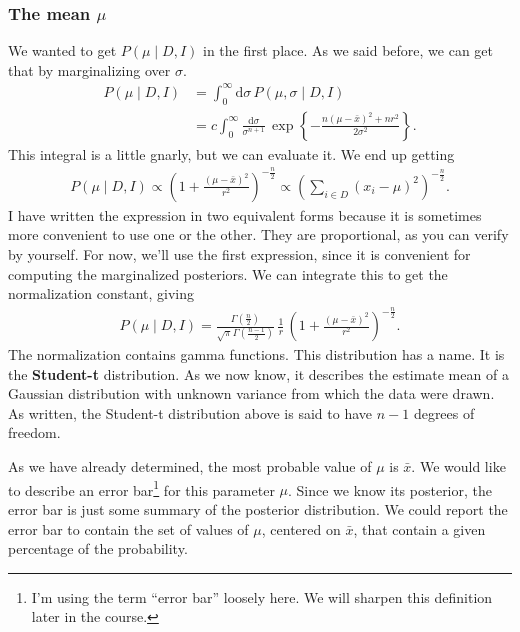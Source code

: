 \subsubsection{The mean $\mu$}
We wanted to get $P(\mu\mid D, I)$ in the first place.  As we said
before, we can get that by marginalizing over $\sigma$.
\begin{align}
P(\mu\mid D, I) &= \int_0^\infty \mathrm{d}\sigma\,P(\mu, \sigma \mid D, I) \\ \nonumber
&= c\int_0^\infty \frac{\mathrm{d}\sigma}{\sigma^{n+1}}\,
\exp\left\{-\frac{n(\mu - \bar{x})^2 + nr^2}{2\sigma^2}\right\}.
\end{align}
This integral is a little gnarly, but we can evaluate it.  We end up
getting
\begin{align}
P(\mu\mid D, I) \propto \left(1 + \frac{(\mu - \bar{x})^2}{r^2}\right)^{-\frac{n}{2}} \propto \left(\sum_{i\in D} (x_i - \mu)^2\right)^{-\frac{n}{2}}.
\end{align}
I have written the expression in two equivalent forms because it is sometimes more convenient to use one or the other. They are proportional, as you can verify by yourself. For now, we'll use the first expression, since it is convenient for computing the marginalized posteriors.
We can integrate this to get the normalization constant, giving
\begin{align}
P(\mu\mid D, I) = \frac{\Gamma\left(\frac{n}{2}\right)}{\sqrt{\pi}\Gamma\left(\frac{n-1}{2}\right)}\,\frac{1}{r}\,\left(1 + \frac{(\mu - \bar{x})^2}{r^2}\right)^{-\frac{n}{2}}.
\end{align}
The normalization contains gamma functions.  This distribution has a
name.  It is the \textbf{Student-t} distribution.  As we now know, it
describes the estimate mean of a Gaussian distribution with unknown variance from which the data were drawn.  As written, the Student-t
distribution above is said to have $n-1$ degrees of freedom.

As we have already determined, the most probable value of $\mu$ is
$\bar{x}$.  We would like to describe an error bar\footnote{I'm using the term ``error bar'' loosely
  here.  We will sharpen this definition later in the course.} for
this parameter $\mu$.  Since we know its posterior, the error bar is just some summary of the posterior distribution.  We could
report the error bar to contain the set of values of $\mu$,
centered on $\bar{x}$, that contain a given percentage of the
probability.

